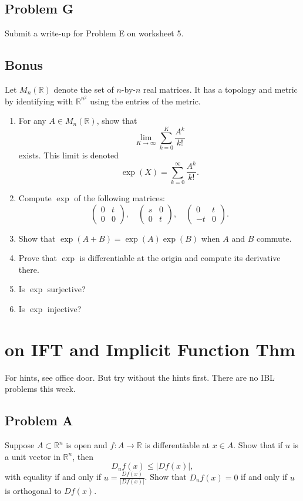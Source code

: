 \documentclass[lang=cn,11pt]{template}
\begin{document}
\section*{Problem G}
Submit a write-up for Problem E on worksheet 5.

\section*{Bonus}
Let $M_n(\mathbb{R})$ denote the set of $n$-by-$n$ real matrices. It has a topology and metric by identifying with $\mathbb{R}^{n^2}$ using the entries of the metric.
\begin{enumerate}
    \item For any $A \in M_n(\mathbb{R})$, show that
    \[
    \lim_{K \to \infty} \sum_{k=0}^K \frac{A^k}{k!}
    \]
    exists. This limit is denoted
    \[
    \exp(X) = \sum_{k=0}^\infty \frac{A^k}{k!}.
    \]
    \item Compute $\exp$ of the following matrices:
    \[
    \begin{pmatrix} 0 & t \\ 0 & 0 \end{pmatrix}, \quad \begin{pmatrix} s & 0 \\ 0 & t \end{pmatrix}, \quad \begin{pmatrix} 0 & t \\ -t & 0 \end{pmatrix}.
    \]
    \item Show that $\exp(A + B) = \exp(A)\exp(B)$ when $A$ and $B$ commute.
    \item Prove that $\exp$ is differentiable at the origin and compute its derivative there.
    \item Is $\exp$ surjective?
    \item Is $\exp$ injective?
\end{enumerate}

\chapter{on IFT and Implicit Function Thm}

For hints, see office door. But try without the hints first. There are no IBL problems this week.

\section*{Problem A}
Suppose $A \subset \mathbb{R}^n$ is open and $f : A \to \mathbb{R}$ is differentiable at $x \in A$. Show that if $u$ is a unit vector in $\mathbb{R}^n$, then
\[
D_u f(x) \leq |Df(x)|,
\]
with equality if and only if $u = \frac{Df(x)}{|Df(x)|}$. Show that $D_u f(x) = 0$ if and only if $u$ is orthogonal to $Df(x)$.
\end{document}
